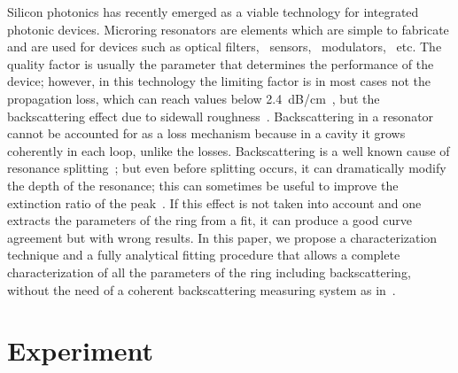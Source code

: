 \documentclass[10pt,letterpaper]{article}
\begin{document}
Silicon photonics has recently emerged as a viable technology for integrated photonic devices. Microring resonators are elements which are simple to fabricate and are used for devices such as optical filters,~\cite{Little1998} sensors,~\cite{DeVos2007} modulators,~\cite{So2004} etc. The quality factor is usually the parameter that determines the performance of the device; however, in this technology the limiting factor is in most cases not the propagation loss, which can reach values below 2.4~dB/cm~\cite{Dumon2004}, but the backscattering effect due to sidewall roughness~\cite{Morichetti2010a}. Backscattering in a resonator cannot be accounted for as a loss mechanism because in a cavity it grows coherently in each loop, unlike the losses. Backscattering is a well known cause of resonance splitting~\cite{Little1997a,Kippenberg2002}; but even before splitting occurs, it can dramatically modify the depth of the resonance; this can sometimes be useful to improve the extinction ratio of the peak~\cite{Zhang2008}. If this effect is not taken into account and one extracts the parameters of the ring from a fit, it can produce a good curve agreement but with wrong results.  In this paper, we propose a characterization technique and a fully analytical fitting procedure that allows a complete characterization of all the parameters of the ring including backscattering, without the need of a coherent backscattering measuring system as in~\cite{Morichetti2010a,Morichetti2010b}.

\section{Experiment}
\end{document}
